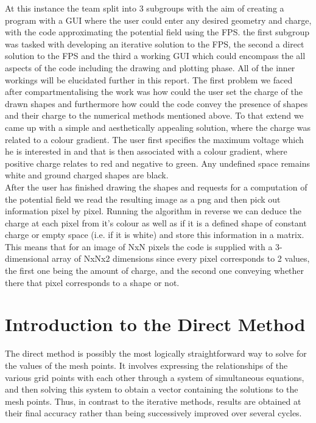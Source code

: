 \documentclass[a4paper]{article}
\begin{document}
At this instance the team split into 3 subgroups with the aim of creating a program with a GUI where the user could enter any desired geometry and charge, with the code approximating the potential field using the FPS. the first subgroup was tasked with developing an iterative solution to the FPS, the second a direct solution to the FPS and the third a working GUI which could encompass the all aspects of the code including the drawing and plotting phase. All of the inner workings will be elucidated further in this report.
The first problem we faced after compartmentalising the work was how could the user set the charge of the drawn shapes and furthermore how could the code convey the presence of shapes and their charge to the numerical methods mentioned above. To that extend we came up with a simple and aesthetically appealing solution, where the charge was related to a colour gradient. The user first specifies the maximum voltage which he is interested in and that is then associated with a colour gradient, where positive charge relates to red and negative to green. Any undefined space remains white and ground charged shapes are black.\\

\noindent
After the user has finished drawing the shapes and requests for a computation of the potential field we read the resulting image as a png and then pick out information pixel by pixel. Running the algorithm in reverse we can deduce the charge at each pixel from it's colour as well as if it is a defined shape of constant charge or empty space (i.e. if it is white) and store this information in a matrix. This means that for an image of NxN pixels the code is supplied with a 3-dimensional array of NxNx2 dimensions since every pixel corresponds to 2 values, the first one being the amount of charge, and the second one conveying whether there that pixel corresponds to a shape or not. 

\newpage


\section{Introduction to the Direct Method}
The direct method is possibly the most logically straightforward way to solve
for the values of the mesh points. It involves expressing the relationships of
the various grid points with each other through a system of simultaneous
equations, and then solving this system to obtain a vector containing the
solutions to the mesh points. Thus, in contrast to the iterative methods,
results are obtained at their final accuracy rather than being successively
improved over several cycles.
\end{document}
